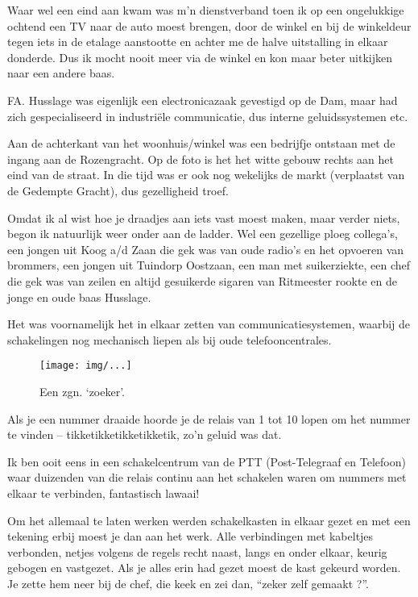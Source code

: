 \documentclass[10pt,twoside,openright]{memoir}
\begin{document}
Waar wel een eind aan kwam was m’n dienstverband toen ik op een ongelukkige ochtend een TV naar de auto moest brengen, door de winkel en bij de winkeldeur tegen iets in de etalage aanstootte en achter me de halve uitstalling in elkaar donderde. Dus ik mocht nooit meer via de winkel en kon maar beter uitkijken naar een andere baas.

FA. Husslage was eigenlijk een electronicazaak gevestigd op de Dam, maar had zich gespecialiseerd in industriële communicatie, dus interne geluidssystemen etc. 

Aan de achterkant van het woonhuis/winkel was een bedrijfje ontstaan met de ingang aan de Rozengracht. Op de foto is het het witte gebouw rechts aan het eind van de straat. 
In die tijd was er ook nog wekelijks de markt (verplaatst van de Gedempte Gracht), dus gezelligheid troef. 

Omdat ik al wist hoe je draadjes aan iets vast moest maken, maar verder niets, begon ik natuurlijk weer onder aan de ladder. Wel een gezellige ploeg collega’s, een jongen uit Koog a/d Zaan die gek was van oude radio’s en het opvoeren van brommers, een jongen uit Tuindorp Oostzaan, een man met suikerziekte, een chef die gek was van zeilen en altijd gesuikerde sigaren van Ritmeester rookte en de jonge en oude baas Husslage. 

Het was voornamelijk het in elkaar zetten van communicatiesystemen, waarbij de schakelingen nog mechanisch liepen als bij oude telefooncentrales. 

\begin{figure}[t]
\texttt{[image: img/...]}
\caption{Een zgn. ‘zoeker’.}
\end{figure}

Als je een nummer draaide hoorde je de relais van 1 tot 10 lopen om het nummer te vinden – tikketikketikketikketik, zo’n geluid was dat. 

Ik ben ooit eens in een schakelcentrum van de PTT (Post-Telegraaf en Telefoon) waar duizenden van die relais continu aan het schakelen waren om nummers met elkaar te verbinden, fantastisch lawaai! 

Om het allemaal te laten werken werden schakelkasten in elkaar gezet en met een tekening erbij moest je dan aan het werk. Alle verbindingen met kabeltjes verbonden, netjes volgens de regels recht naast, langs en onder elkaar, keurig gebogen en vastgezet. Als je alles erin had gezet moest de kast gekeurd worden. Je zette hem neer bij de chef, die keek en zei dan, ``zeker zelf gemaakt ?''.
\end{document}
